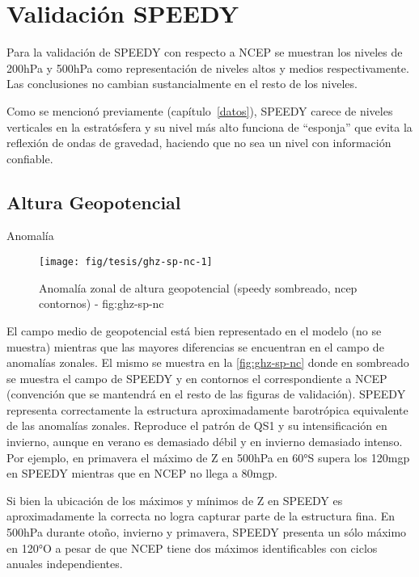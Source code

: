 \documentclass[spanish,a4paper,12p]{book}
\begin{document}
\section{Validación SPEEDY}\label{validacion-speedy}

Para la validación de SPEEDY con respecto a NCEP se muestran los niveles
de 200hPa y 500hPa como representación de niveles altos y medios
respectivamente. Las conclusiones no cambian sustancialmente en el resto
de los niveles.

Como se mencionó previamente (capítulo~\ref{datos}), SPEEDY carece de
niveles verticales en la estratósfera y su nivel más alto funciona de
``esponja'' que evita la reflexión de ondas de gravedad, haciendo que no
sea un nivel con información confiable.

\subsection{Altura Geopotencial}\label{altura-geopotencial-1}

Anomalía

\begin{landscape}\begin{figure}

{\centering \texttt{[image: fig/tesis/ghz-sp-nc-1]} 

}

\caption{Anomalía zonal de altura geopotencial (speedy sombreado, ncep contornos) - fig:ghz-sp-nc}\label{fig:ghz-sp-nc}
\end{figure}
\end{landscape}

El campo medio de geopotencial está bien representado en el modelo (no
se muestra) mientras que las mayores diferencias se encuentran en el
campo de anomalías zonales. El mismo se muestra en la
\autoref{fig:ghz-sp-nc} donde en sombreado se muestra el campo de SPEEDY
y en contornos el correspondiente a NCEP (convención que se mantendrá en
el resto de las figuras de validación). SPEEDY representa correctamente
la estructura aproximadamente barotrópica equivalente de las anomalías
zonales. Reproduce el patrón de QS1 y su intensificación en invierno,
aunque en verano es demasiado débil y en invierno demasiado intenso. Por
ejemplo, en primavera el máximo de Z en 500hPa en 60°S supera los 120mgp
en SPEEDY mientras que en NCEP no llega a 80mgp.

Si bien la ubicación de los máximos y mínimos de Z en SPEEDY es
aproximadamente la correcta no logra capturar parte de la estructura
fina. En 500hPa durante otoño, invierno y primavera, SPEEDY presenta un
sólo máximo en 120°O a pesar de que NCEP tiene dos máximos
identificables con ciclos anuales independientes.
\end{document}
